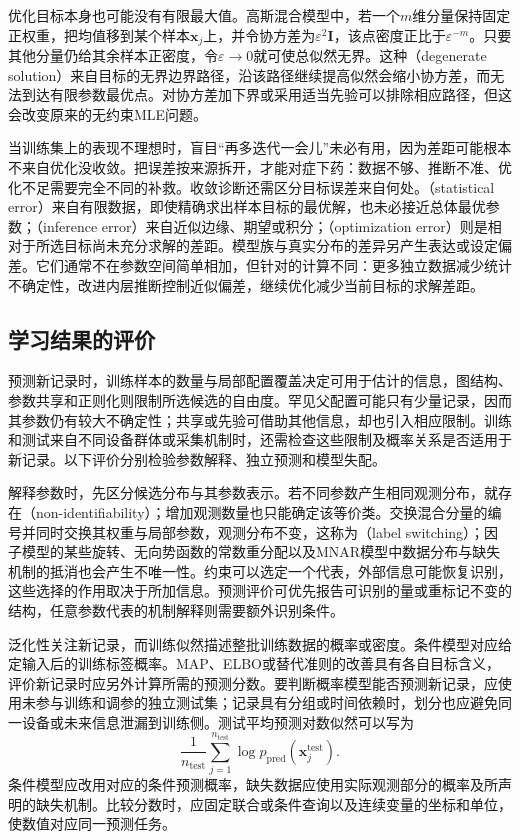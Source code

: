 优化目标本身也可能没有有限最大值。高斯混合模型中，若一个$m$维分量保持固定正权重，把均值移到某个样本$\bm{x}_j$上，并令协方差为$\varepsilon^2\bm{I}$，该点密度正比于$\varepsilon^{-m}$。只要其他分量仍给其余样本正密度，令$\varepsilon\to0$就可使总似然无界。这种（degenerate solution）来自目标的无界边界路径，沿该路径继续提高似然会缩小协方差，而无法到达有限参数最优点。对协方差加下界或采用适当先验可以排除相应路径，但这会改变原来的无约束MLE问题。

当训练集上的表现不理想时，盲目“再多迭代一会儿”未必有用，因为差距可能根本不来自优化没收敛。把误差按来源拆开，才能对症下药：数据不够、推断不准、优化不足需要完全不同的补救。收敛诊断还需区分目标误差来自何处。（statistical error）来自有限数据，即使精确求出样本目标的最优解，也未必接近总体最优参数；（inference error）来自近似边缘、期望或积分；（optimization error）则是相对于所选目标尚未充分求解的差距。模型族与真实分布的差异另产生表达或设定偏差。它们通常不在参数空间简单相加，但针对的计算不同：更多独立数据减少统计不确定性，改进内层推断控制近似偏差，继续优化减少当前目标的求解差距。

\subsection{学习结果的评价}
\label{sec:pgm-parameter-learning-evaluation}

预测新记录时，训练样本的数量与局部配置覆盖决定可用于估计的信息，图结构、参数共享和正则化则限制所选候选的自由度。罕见父配置可能只有少量记录，因而其参数仍有较大不确定性；共享或先验可借助其他信息，却也引入相应限制。训练和测试来自不同设备群体或采集机制时，还需检查这些限制及概率关系是否适用于新记录。以下评价分别检验参数解释、独立预测和模型失配。

解释参数时，先区分候选分布与其参数表示。若不同参数产生相同观测分布，就存在（non-identifiability）；增加观测数量也只能确定该等价类。交换混合分量的编号并同时交换其权重与局部参数，观测分布不变，这称为（label switching）；因子模型的某些旋转、无向势函数的常数重分配以及MNAR模型中数据分布与缺失机制的抵消也会产生不唯一性。约束可以选定一个代表，外部信息可能恢复识别，这些选择的作用取决于所加信息。预测评价可优先报告可识别的量或重标记不变的结构，任意参数代表的机制解释则需要额外识别条件。

泛化性关注新记录，而训练似然描述整批训练数据的概率或密度。条件模型对应给定输入后的训练标签概率。MAP、ELBO或替代准则的改善具有各自目标含义，评价新记录时应另外计算所需的预测分数。要判断概率模型能否预测新记录，应使用未参与训练和调参的独立测试集；记录具有分组或时间依赖时，划分也应避免同一设备或未来信息泄漏到训练侧。测试平均预测对数似然可以写为
\[
  \frac{1}{n_{\mathrm{test}}}
  \sum_{j=1}^{n_{\mathrm{test}}}
    \log p_{\mathrm{pred}}(\bm{x}^{\mathrm{test}}_j).
\]
条件模型应改用对应的条件预测概率，缺失数据应使用实际观测部分的概率及所声明的缺失机制。比较分数时，应固定联合或条件查询以及连续变量的坐标和单位，使数值对应同一预测任务。

